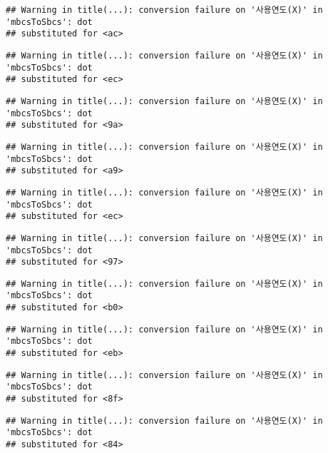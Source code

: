 \documentclass[
]{article}
\begin{document}
\begin{verbatim}
## Warning in title(...): conversion failure on '사용연도(X)' in 'mbcsToSbcs': dot
## substituted for <ac>
\end{verbatim}

\begin{verbatim}
## Warning in title(...): conversion failure on '사용연도(X)' in 'mbcsToSbcs': dot
## substituted for <ec>
\end{verbatim}

\begin{verbatim}
## Warning in title(...): conversion failure on '사용연도(X)' in 'mbcsToSbcs': dot
## substituted for <9a>
\end{verbatim}

\begin{verbatim}
## Warning in title(...): conversion failure on '사용연도(X)' in 'mbcsToSbcs': dot
## substituted for <a9>
\end{verbatim}

\begin{verbatim}
## Warning in title(...): conversion failure on '사용연도(X)' in 'mbcsToSbcs': dot
## substituted for <ec>
\end{verbatim}

\begin{verbatim}
## Warning in title(...): conversion failure on '사용연도(X)' in 'mbcsToSbcs': dot
## substituted for <97>
\end{verbatim}

\begin{verbatim}
## Warning in title(...): conversion failure on '사용연도(X)' in 'mbcsToSbcs': dot
## substituted for <b0>
\end{verbatim}

\begin{verbatim}
## Warning in title(...): conversion failure on '사용연도(X)' in 'mbcsToSbcs': dot
## substituted for <eb>
\end{verbatim}

\begin{verbatim}
## Warning in title(...): conversion failure on '사용연도(X)' in 'mbcsToSbcs': dot
## substituted for <8f>
\end{verbatim}

\begin{verbatim}
## Warning in title(...): conversion failure on '사용연도(X)' in 'mbcsToSbcs': dot
## substituted for <84>
\end{verbatim}
\end{document}
